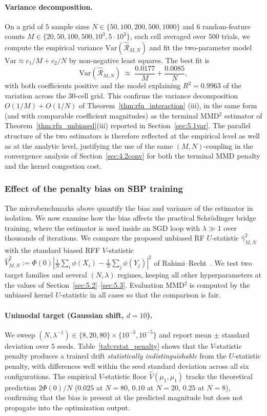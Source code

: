 \documentclass[11pt,leqno]{article}
\theoremstyle{plain}
\theoremstyle{remark}
\theoremstyle{definition}
\numberwithin{equation}{section}
\numberwithin{figure}{section}
\numberwithin{table}{section}
\numberwithin{algorithm}{section}
\begin{document}
\paragraph{Variance decomposition.}
On a grid of $5$ sample sizes $N\in\{50, 100, 200, 500, 1000\}$
and $6$ random-feature counts $M\in\{20, 50, 100, 500, 10^3, 5\!\cdot\!10^3\}$,
each cell averaged over $500$ trials,
we compute the empirical variance $\mathrm{Var}(\hat{\mathcal{R}}_{M,N})$
and fit the two-parameter model $\mathrm{Var}\approx c_1/M + c_2/N$
by non-negative least squares.
The best fit is
\[
 \mathrm{Var}(\hat{\mathcal{R}}_{M,N}) \;\approx\; \frac{0.0177}{M} + \frac{0.0085}{N},
\]
with both coefficients positive and the model explaining $R^2=0.9963$ of the variation
across the $30$-cell grid.
This confirms the variance decomposition $O(1/M)+O(1/N)$ of Theorem~\ref{thm:rfu_interaction} (iii),
in the same form (and with comparable coefficient magnitudes) as the terminal MMD${}^2$ estimator
of Theorem~\ref{thm:rfu_unbiased}(iii) reported in Section~\ref{sec:5.1var}.
The parallel structure of the two estimators is therefore reflected at the empirical level
as well as at the analytic level,
justifying the use of the same $(M,N)$-coupling in the convergence analysis of Section~\ref{sec:4.2conv}
for both the terminal MMD penalty and the kernel congestion cost.


\subsubsection{Effect of the penalty bias on SBP training}\label{sec:5.1.3vs}

The microbenchmarks above quantify the bias and variance of the estimator in isolation.
We now examine how the bias affects the practical Schr{\"o}dinger bridge training,
where the estimator is used inside an SGD loop with $\lambda\gg 1$ over thousands of iterations.
We compare the proposed unbiased RF $U$-statistic $\hat{\gamma}_{M,N}^2$
with the standard biased RFF $V$-statistic
$\hat{V}_{M,N}^2:= \Phi(0)|\frac{1}{N}\sum_i \phi(X_i)-\frac{1}{N}\sum_j\phi(Y_j)|^2$
of Rahimi--Recht~\cite{rah-rec:2007}.
We test two target families and several $(N,\lambda)$ regimes,
keeping all other hyperparameters at the values of Section~\ref{sec:5.2}--\ref{sec:5.3}.
Evaluation MMD${}^2$ is computed by the unbiased kernel $U$-statistic in all cases
so that the comparison is fair.

\paragraph{Unimodal target (Gaussian shift, $d=10$).}
We sweep $(N,\lambda^{-1})\in\{8,20,80\}\times\{10^{-3},10^{-5}\}$ and report mean $\pm$ standard deviation over $5$ seeds.
Table~\ref{tab:vstat_penalty} shows that the $V$-statistic penalty produces a trained drift
\emph{statistically indistinguishable} from the $U$-statistic penalty,
with differences well within the seed standard deviation across all six configurations.
The empirical $V$-statistic floor $\hat{V}(\mu_1,\mu_1)$
tracks the theoretical prediction $2\Phi(0)/N$ ($0.025$ at $N=80$, $0.10$ at $N=20$, $0.25$ at $N=8$),
confirming that the bias is present at the predicted magnitude
but does not propagate into the optimization output.
\end{document}

